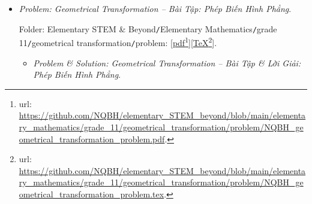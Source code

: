 \documentclass[12pt]{article}
\begin{document}
\begin{itemize}
	Folder: {\sf Elementary STEM \& Beyond{\tt/}Elementary Mathematics{\tt/}grade 11{\tt/}orthogonality{\tt/}problem}: [\href{https://github.com/NQBH/elementary_STEM_beyond/blob/main/elementary_mathematics/grade_11/orthogonality/problem/NQBH_orthogonality_problem.pdf}{pdf}\footnote{{\sc url}: \url{https://github.com/NQBH/elementary_STEM_beyond/blob/main/elementary_mathematics/grade_11/orthogonality/problem/NQBH_orthogonality_problem.pdf}.}][\href{https://github.com/NQBH/elementary_STEM_beyond/blob/main/elementary_mathematics/grade_11/orthogonality/problem/NQBH_orthogonality_problem.tex}{\TeX}\footnote{{\sc url}: \url{https://github.com/NQBH/elementary_STEM_beyond/blob/main/elementary_mathematics/grade_11/orthogonality/problem/NQBH_orthogonality_problem.tex}.}].
	\begin{itemize}
		\item {\it Problem \& Solution: Perpendicular Relation in 3D Space. Orthographic Projection -- Bài Tập \& Lời Giải: Quan Hệ Vuông Góc Trong Không Gian 3D. Phép Chiếu Vuông Góc}.
		
		Folder: {\sf Elementary STEM \& Beyond{\tt/}Elementary Mathematics{\tt/}grade 11{\tt/}orthogonality{\tt/}solution}: [\href{https://github.com/NQBH/elementary_STEM_beyond/blob/main/elementary_mathematics/grade_11/orthogonality/solution/NQBH_orthogonality_solution.pdf}{pdf}\footnote{{\sc url}: \url{https://github.com/NQBH/elementary_STEM_beyond/blob/main/elementary_mathematics/grade_11/orthogonality/solution/NQBH_orthogonality_solution.pdf}.}][\href{https://github.com/NQBH/elementary_STEM_beyond/blob/main/elementary_mathematics/grade_11/orthogonality/solution/NQBH_orthogonality_solution.tex}{\TeX}\footnote{{\sc url}: \url{https://github.com/NQBH/elementary_STEM_beyond/blob/main/elementary_mathematics/grade_11/orthogonality/solution/NQBH_orthogonality_solution.tex}.}].
	\end{itemize}
	\item {\it Problem: Geometrical Transformation -- Bài Tập: Phép Biến Hình Phẳng}.
	
	Folder: {\sf Elementary STEM \& Beyond{\tt/}Elementary Mathematics{\tt/}grade 11{\tt/}geometrical transformation{\tt/}problem}: [\href{https://github.com/NQBH/elementary_STEM_beyond/blob/main/elementary_mathematics/grade_11/geometrical_transformation/problem/NQBH_geometrical_transformation_problem.pdf}{pdf}\footnote{{\sc url}: \url{https://github.com/NQBH/elementary_STEM_beyond/blob/main/elementary_mathematics/grade_11/geometrical_transformation/problem/NQBH_geometrical_transformation_problem.pdf}.}][\href{https://github.com/NQBH/elementary_STEM_beyond/blob/main/elementary_mathematics/grade_11/geometrical_transformation/problem/NQBH_geometrical_transformation_problem.tex}{\TeX}\footnote{{\sc url}: \url{https://github.com/NQBH/elementary_STEM_beyond/blob/main/elementary_mathematics/grade_11/geometrical_transformation/problem/NQBH_geometrical_transformation_problem.tex}.}].
	\begin{itemize}
		\item {\it Problem \& Solution: Geometrical Transformation -- Bài Tập \& Lời Giải: Phép Biến Hình Phẳng}.
		

\end{itemize}
\end{itemize}
\end{document}
